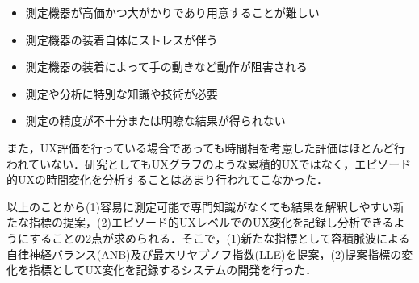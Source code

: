\begin{itemize}
  \item 測定機器が高価かつ大がかりであり用意することが難しい
  \item 測定機器の装着自体にストレスが伴う
  \item 測定機器の装着によって手の動きなど動作が阻害される
  \item 測定や分析に特別な知識や技術が必要
  \item 測定の精度が不十分または明瞭な結果が得られない
\end{itemize}

また，UX評価を行っている場合であっても時間相を考慮した評価はほとんど行われていない．研究としてもUXグラフ\cite{kurosu2015}のような累積的UXではなく，エピソード的UXの時間変化を分析することはあまり行われてこなかった．

以上のことから(1)容易に測定可能で専門知識がなくても結果を解釈しやすい新たな指標の提案，(2)エピソード的UXレベルでのUX変化を記録し分析できるようにすることの2点が求められる．そこで，(1)新たな指標として容積脈波による自律神経バランス(ANB)及び最大リヤプノフ指数(LLE)を提案，(2)提案指標の変化を指標としてUX変化を記録するシステムの開発を行った．
